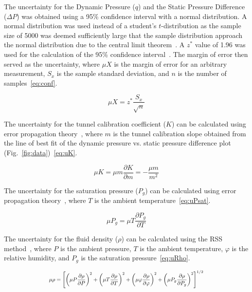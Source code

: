 \documentclass[journal,letterpaper]{IEEEtran}
\begin{document}
The uncertainty for the Dynamic Pressure ($q$) and the Static Pressure Difference ($\Delta P$) was obtained using a 95\% confidence interval with a normal distribution.
A normal distribution was used instead of a student's $t$-distribution as the sample size of 5000 was deemed sufficiently large that the sample distribution approach the normal distribution due to the central limit theorem~\cite{MoMLecture}.
A $z^*$ value of 1.96 was used for the calculation of the 95\% confidence interval~\cite{MoMLecture}.
The margin of error then served as the uncertainty, where $\mu X$ is the margin of error for an arbitrary measurement, $S_x$ is the sample standard deviation, and $n$ is the number of samples~\eqref{eq:conf}.

\begin{equation} \label{eq:conf}
    \mu X = z^* \frac{S_x}{\sqrt{n}}
\end{equation}

The uncertainty for the tunnel calibration coefficient ($K$) can be calculated using error propagation theory~\cite{errorprop}, where $m$ is the tunnel calibration slope obtained from the line of best fit of the dynamic pressure vs. static pressure difference plot (Fig.~\ref{fig:data})~\eqref{eq:uK}.

\begin{equation} \label{eq:uK}
    \mu K = \mu m \frac{\partial K}{\partial m} = -\frac{\mu m}{m^2}
\end{equation}

The uncertainty for the saturation pressure ($P_g$) can be calculated using error propagation theory~\cite{errorprop}, where $T$ is the ambient temperature~\eqref{eq:uPsat}.

\begin{equation} \label{eq:uPsat}
    \mu P_g = \mu T \frac{\partial P_g}{\partial T}
\end{equation}

The uncertainty for the fluid density ($\rho$) can be calculated using the RSS method~\cite{MoMLecture}, where $P$ is the ambient pressure, $T$ is the ambient temperature, $\varphi$ is the relative humidity, and $P_g$ is the saturation pressure~\eqref{eq:uRho}.

\begin{equation} \label{eq:uRho}
    \resizebox{227pt}{!}{$\displaystyle{\mu \rho = \left[\left(\mu P \frac{\partial \rho}{\partial P}\right)^2 + \left(\mu T \frac{\partial \rho}{\partial T}\right)^2 + \left(\mu \varphi \frac{\partial \rho}{\partial \varphi}\right)^2 + \left(\mu P_g \frac{\partial \rho}{\partial P_g}\right)^2\right]^{1/2}}$}
\end{equation}
\end{document}
